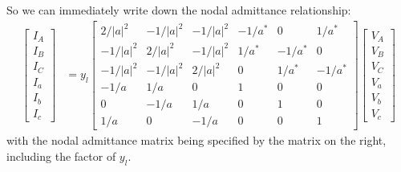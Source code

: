 \documentclass[11pt]{article}
\begin{document}
So we can immediately write down the nodal admittance relationship:
\begin{align}
\begin{bmatrix}I_A \\ I_B \\ I_C \\ I_a \\ I_b \\ I_c\end{bmatrix} &=
y_l \begin{bmatrix}
	2/|a|^2 & -1/|a|^2 & -1/|a|^2 & -1/a^* & 0 & 1/a^* \\
	-1/|a|^2 & 2/|a|^2 &  -1/|a|^2 & 1/a^*  & -1/a^* & 0 \\
	-1/|a|^2 &  -1/|a|^2 & 2/|a|^2 & 0 & 1/a^*  & -1/a^* \\
	-1/a & 1/a & 0 & 1 & 0 & 0 \\
	0 & -1/a & 1/a & 0 & 1 & 0 \\
	1/a & 0 & -1/a & 0 & 0 & 1
\end{bmatrix}
\begin{bmatrix}V_A \\ V_B \\ V_C \\ V_a \\ V_b \\ V_c\end{bmatrix}
\end{align}
with the nodal admittance matrix being specified by the matrix on the right, including the factor of $y_l$.
\end{document}
